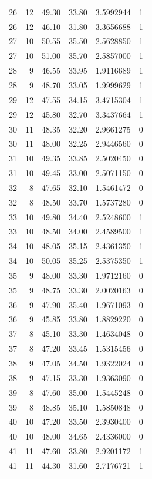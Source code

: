 \documentclass[
  letterpaper,
  DIV=11,
  numbers=noendperiod]{scrreprt}
\renewcommand{\[}{\begin{equation}}
\renewcommand{\]}{\end{equation}}
\begin{document}
\begin{table}
\begin{tabular*}{\linewidth}{@{\extracolsep{\fill}}rrrrrr}
26 & 12 & 49.30 & 33.80 & 3.5992944 & 1 \\ 
26 & 12 & 46.10 & 31.80 & 3.3656688 & 1 \\ 
27 & 10 & 50.55 & 35.50 & 2.5628850 & 1 \\ 
27 & 10 & 51.00 & 35.70 & 2.5857000 & 1 \\ 
28 & 9 & 46.55 & 33.95 & 1.9116689 & 1 \\ 
28 & 9 & 48.70 & 33.05 & 1.9999629 & 1 \\ 
29 & 12 & 47.55 & 34.15 & 3.4715304 & 1 \\ 
29 & 12 & 45.80 & 32.70 & 3.3437664 & 1 \\ 
30 & 11 & 48.35 & 32.20 & 2.9661275 & 0 \\ 
30 & 11 & 48.00 & 32.25 & 2.9446560 & 0 \\ 
31 & 10 & 49.35 & 33.85 & 2.5020450 & 0 \\ 
31 & 10 & 49.45 & 33.00 & 2.5071150 & 0 \\ 
32 & 8 & 47.65 & 32.10 & 1.5461472 & 0 \\ 
32 & 8 & 48.50 & 33.70 & 1.5737280 & 0 \\ 
33 & 10 & 49.80 & 34.40 & 2.5248600 & 1 \\ 
33 & 10 & 48.50 & 34.00 & 2.4589500 & 1 \\ 
34 & 10 & 48.05 & 35.15 & 2.4361350 & 1 \\ 
34 & 10 & 50.05 & 35.25 & 2.5375350 & 1 \\ 
35 & 9 & 48.00 & 33.30 & 1.9712160 & 0 \\ 
35 & 9 & 48.75 & 33.30 & 2.0020163 & 0 \\ 
36 & 9 & 47.90 & 35.40 & 1.9671093 & 0 \\ 
36 & 9 & 45.85 & 33.80 & 1.8829220 & 0 \\ 
37 & 8 & 45.10 & 33.30 & 1.4634048 & 0 \\ 
37 & 8 & 47.20 & 33.45 & 1.5315456 & 0 \\ 
38 & 9 & 47.05 & 34.50 & 1.9322024 & 0 \\ 
38 & 9 & 47.15 & 33.30 & 1.9363090 & 0 \\ 
39 & 8 & 47.60 & 35.00 & 1.5445248 & 0 \\ 
39 & 8 & 48.85 & 35.10 & 1.5850848 & 0 \\ 
40 & 10 & 47.20 & 33.50 & 2.3930400 & 0 \\ 
40 & 10 & 48.00 & 34.65 & 2.4336000 & 0 \\ 
41 & 11 & 47.60 & 33.80 & 2.9201172 & 1 \\ 
41 & 11 & 44.30 & 31.60 & 2.7176721 & 1 \\ 

\end{tabular*}
\end{table}
\end{document}
